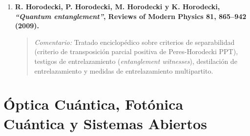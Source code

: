 \documentclass[11pt,a4paper,twoside]{report}
\theoremstyle{definition}
\theoremstyle{plain}
\theoremstyle{remark}
\begin{document}
\begin{enumerate}
    \item \textbf{R. Horodecki, P. Horodecki, M. Horodecki y K. Horodecki, \textit{``Quantum entanglement''}, Reviews of Modern Physics 81, 865--942 (2009).}
    \begin{quote}
        \textit{Comentario:} Tratado enciclopédico sobre criterios de separabilidad (criterio de transposición parcial positiva de Peres-Horodecki PPT), testigos de entrelazamiento (\textit{entanglement witnesses}), destilación de entrelazamiento y medidas de entrelazamiento multipartito.
    \end{quote}
\end{enumerate}

\section{Óptica Cuántica, Fotónica Cuántica y Sistemas Abiertos}
\end{document}
